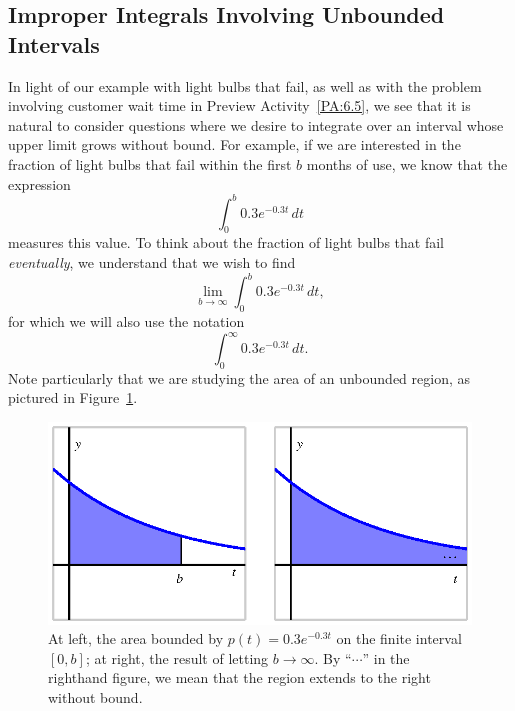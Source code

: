 

\subsection*{Improper Integrals Involving Unbounded Intervals} 

In light of our example with light bulbs that fail, as well as with the problem involving customer wait time in Preview Activity~\ref{PA:6.5}, we see that it is natural to consider questions where we desire to integrate over an interval whose upper limit grows without bound.  For example, if we are interested in the fraction of light bulbs that fail within the first $b$ months of use, we know that the expression
$$\int_0^b 0.3e^{-0.3t} \, dt$$
measures this value.  To think about the fraction of light bulbs that fail \emph{eventually}, we understand that we wish to find
$$\lim_{b \to \infty} \int_0^b 0.3e^{-0.3t} \, dt,$$
for which we will also use the notation 
\begin{equation} \label{E:ImpInt1}
\int_0^\infty 0.3e^{-0.3t} \, dt.
\end{equation}
Note particularly that we are studying the area of an unbounded region, as pictured in Figure~\ref{F:6.5.InfReg}.

\begin{figure}[h]
\begin{center}
\includegraphics{figures/6_5_InfReg.eps}
\caption{At left, the area bounded by $p(t) = 0.3e^{-0.3t}$ on the finite interval $[0,b]$; at right, the result of letting $b \to \infty$.  By ``$\cdots$'' in the righthand figure, we mean that the region extends to the right without bound.} \label{F:6.5.InfReg}
\end{center}
\end{figure}

